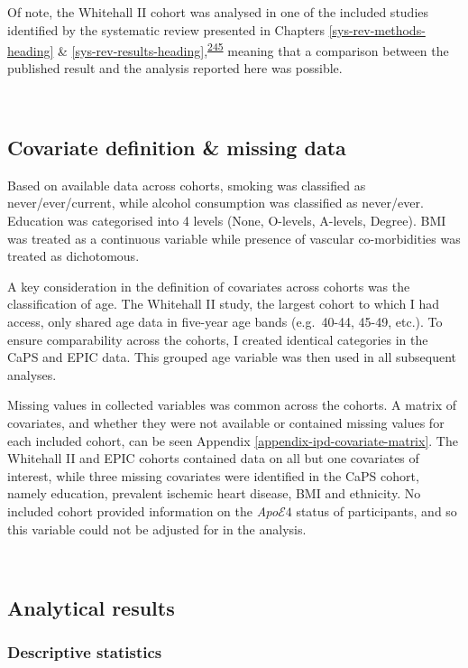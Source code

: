 \documentclass[a4paper, twoside]{templates/ociamthesis}
\begin{document}
Of note, the Whitehall II cohort was analysed in one of the included studies identified by the systematic review presented in Chapters \ref{sys-rev-methods-heading} \& \ref{sys-rev-results-heading},\textsuperscript{\protect\hyperlink{ref-tynkkynen2018}{245}} meaning that a comparison between the published result and the analysis reported here was possible.

~

\hypertarget{ipd-covar-definition}{%
\subsection{Covariate definition \& missing data}\label{ipd-covar-definition}}

Based on available data across cohorts, smoking was classified as never/ever/current, while alcohol consumption was classified as never/ever. Education was categorised into 4 levels (None, O-levels, A-levels, Degree). BMI was treated as a continuous variable while presence of vascular co-morbidities was treated as dichotomous.

A key consideration in the definition of covariates across cohorts was the classification of age. The Whitehall II study, the largest cohort to which I had access, only shared age data in five-year age bands (e.g.~40-44, 45-49, etc.). To ensure comparability across the cohorts, I created identical categories in the CaPS and EPIC data. This grouped age variable was then used in all subsequent analyses.

Missing values in collected variables was common across the cohorts. A matrix of covariates, and whether they were not available or contained missing values for each included cohort, can be seen Appendix \ref{appendix-ipd-covariate-matrix}. The Whitehall II and EPIC cohorts contained data on all but one covariates of interest, while three missing covariates were identified in the CaPS cohort, namely education, prevalent ischemic heart disease, BMI and ethnicity. No included cohort provided information on the \emph{Apo}\(\mathcal{E}4\) status of participants, and so this variable could not be adjusted for in the analysis.

~

\hypertarget{analytical-results}{%
\subsection{Analytical results}\label{analytical-results}}

\hypertarget{descriptive-statistics}{%
\subsubsection{Descriptive statistics}\label{descriptive-statistics}}
\end{document}
